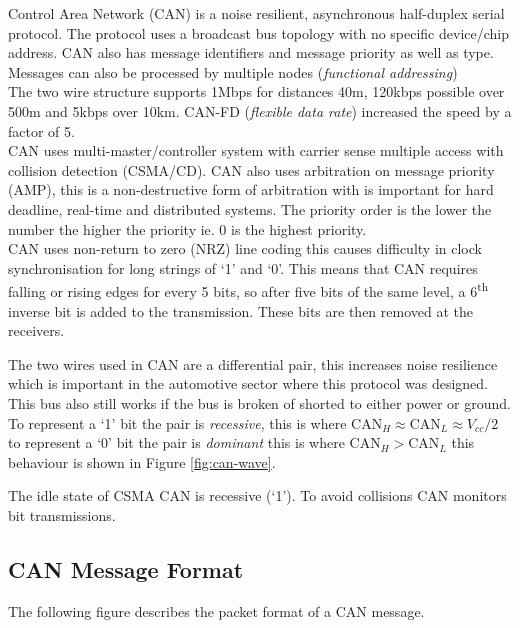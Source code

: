 Control Area Network (CAN) is a noise resilient, asynchronous half-duplex serial protocol. The
protocol uses a broadcast bus topology with no specific device/chip address. CAN also has message
identifiers and message priority as well as type. Messages can also be processed by multiple nodes
(\textit{functional addressing})\\

\noindent The two wire structure supports 1Mbps for distances 40m, 120kbps possible over 500m and 
5kbps over 10km. CAN-FD (\textit{flexible data rate}) increased the speed by a factor of 5.\\

\noindent CAN uses multi-master/controller system with carrier sense multiple access with collision
detection (CSMA/CD). CAN also uses arbitration on message priority (AMP), this is a non-destructive
form of arbitration with is important for hard deadline, real-time and distributed systems. The
priority order is the lower the number the higher the priority ie. 0 is the highest priority.\\

\noindent CAN uses non-return to zero (NRZ) line coding this causes difficulty in clock
synchronisation for long strings of `1' and `0'. This means that CAN requires falling or rising
edges for every 5 bits, so after five bits of the same level, a 6\textsuperscript{th} inverse bit is
added to the transmission. These bits are then removed at the receivers.



\noindent The two wires used in CAN are a differential pair, this increases noise resilience which
is important in the automotive sector where this protocol was designed. This bus also still works if
the bus is broken of shorted to either power or ground. To represent a `1' bit the pair is
\textit{recessive}, this is where $\textrm{CAN}_H \approx \textrm{CAN}_L \approx V_{cc}/2$ to
represent a `0' bit the pair is \textit{dominant} this is where $\textrm{CAN}_H > \textrm{CAN}_L$
this behaviour is shown in Figure \ref{fig:can-wave}.



The idle state of CSMA CAN is recessive (`1'). To avoid collisions CAN monitors bit transmissions.

\subsection{CAN Message Format}
The following figure describes the packet format of a CAN message.

